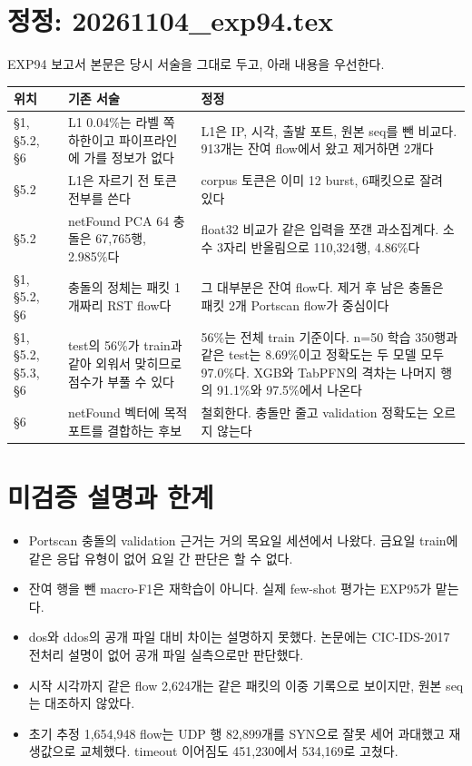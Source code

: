 \section{정정: 20261104\_exp94.tex}
EXP94 보고서 본문은 당시 서술을 그대로 두고, 아래 내용을 우선한다.
\begin{center}\small
\begin{tabularx}{\linewidth}{lYY}
\toprule
위치 & 기존 서술 & 정정\\\midrule
\S1, \S5.2, \S6 & L1 0.04\%는 라벨 쪽 하한이고 파이프라인에 가를 정보가 없다 & L1은 IP, 시각, 출발 포트, 원본 seq를 뺀 비교다. 913개는 잔여 flow에서 왔고 제거하면 2개다\\
\S5.2 & L1은 자르기 전 토큰 전부를 쓴다 & corpus 토큰은 이미 12 burst, 6패킷으로 잘려 있다\\
\S5.2 & netFound PCA 64 충돌은 67,765행, 2.985\%다 & float32 비교가 같은 입력을 쪼갠 과소집계다. 소수 3자리 반올림으로 110,324행, 4.86\%다\\
\S1, \S5.2, \S6 & 충돌의 정체는 패킷 1개짜리 RST flow다 & 그 대부분은 잔여 flow다. 제거 후 남은 충돌은 패킷 2개 Portscan flow가 중심이다\\
\S1, \S5.2, \S5.3, \S6 & test의 56\%가 train과 같아 외워서 맞히므로 점수가 부풀 수 있다 & 56\%는 전체 train 기준이다. n=50 학습 350행과 같은 test는 8.69\%이고 정확도는 두 모델 모두 97.0\%다. XGB와 TabPFN의 격차는 나머지 행의 91.1\%와 97.5\%에서 나온다\\
\S6 & netFound 벡터에 목적 포트를 결합하는 후보 & 철회한다. 충돌만 줄고 validation 정확도는 오르지 않는다\\
\bottomrule
\end{tabularx}
\end{center}

\section{미검증 설명과 한계}
\begin{itemize}
\item Portscan 충돌의 validation 근거는 거의 목요일 세션에서 나왔다. 금요일 train에 같은 응답 유형이 없어 요일 간 판단은 할 수 없다.
\item 잔여 행을 뺀 macro-F1은 재학습이 아니다. 실제 few-shot 평가는 EXP95가 맡는다.
\item dos와 ddos의 공개 파일 대비 차이는 설명하지 못했다. 논문에는 CIC-IDS-2017 전처리 설명이 없어 공개 파일 실측으로만 판단했다.
\item 시작 시각까지 같은 flow 2,624개는 같은 패킷의 이중 기록으로 보이지만, 원본 seq는 대조하지 않았다.
\item 초기 추정 1,654,948 flow는 UDP 행 82,899개를 SYN으로 잘못 세어 과대했고 재생값으로 교체했다. timeout 이어짐도 451,230에서 534,169로 고쳤다.
\end{itemize}

